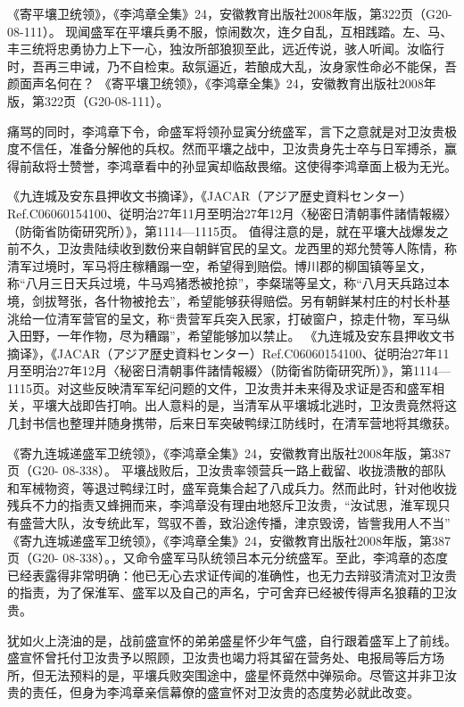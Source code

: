 \documentclass[12pt,UTF8]{ctexbook}
\begin{document}
《寄平壤卫统领》，《李鸿章全集》24，安徽教育出版社2008年版，第322页（G20-08-111）。
现闻盛军在平壤兵勇不服，惊闹数次，连夕自乱，互相践踏。左、马、丰三统将忠勇协力上下一心，独汝所部狼狈至此，远近传说，骇人听闻。汝临行时，吾再三申诫，乃不自检束。敌氛逼近，若酿成大乱，汝身家性命必不能保，吾颜面声名何在？ 《寄平壤卫统领》，《李鸿章全集》24，安徽教育出版社2008年版，第322页（G20-08-111）。

痛骂的同时，李鸿章下令，命盛军将领孙显寅分统盛军，言下之意就是对卫汝贵极度不信任，准备分解他的兵权。然而平壤之战中，卫汝贵身先士卒与日军搏杀，赢得前敌将士赞誉，李鸿章看中的孙显寅却临敌畏缩。这使得李鸿章面上极为无光。

《九连城及安东县押收文书摘译》，《JACAR（アジア歴史資料センター）Ref.C06060154100、従明治27年11月至明治27年12月〈秘密日清朝事件諸情報綴〉（防衛省防衛研究所）》，第1114—1115页。
值得注意的是，就在平壤大战爆发之前不久，卫汝贵陆续收到数份来自朝鲜官民的呈文。龙西里的郑允赞等人陈情，称清军过境时，军马将庄稼糟蹋一空，希望得到赔偿。博川郡的柳国镇等呈文，称“八月三日天兵过境，牛马鸡猪悉被抢掠”，李粲瑞等呈文，称“八月天兵路过本境，剑拔弩张，各什物被抢去”，希望能够获得赔偿。另有朝鲜某村庄的村长朴基洮给一位清军营官的呈文，称“贵营军兵突入民家，打破窗户，掠走什物，军马纵入田野，一年作物，尽为糟蹋”，希望能够加以禁止。 《九连城及安东县押收文书摘译》，《JACAR（アジア歴史資料センター）Ref.C06060154100、従明治27年11月至明治27年12月〈秘密日清朝事件諸情報綴〉（防衛省防衛研究所）》，第1114—1115页。对这些反映清军军纪问题的文件，卫汝贵并未来得及求证是否和盛军相关，平壤大战即告打响。出人意料的是，当清军从平壤城北逃时，卫汝贵竟然将这几封书信也整理并随身携带，后来日军突破鸭绿江防线时，在清军营地将其缴获。

《寄九连城递盛军卫统领》，《李鸿章全集》24，安徽教育出版社2008年版，第387页（G20- 08-338）。
平壤战败后，卫汝贵率领营兵一路上截留、收拢溃散的部队和军械物资，等退过鸭绿江时，盛军竟集合起了八成兵力。然而此时，针对他收拢残兵不力的指责又蜂拥而来，李鸿章没有理由地怒斥卫汝贵，“汝试思，淮军现只有盛营大队，汝专统此军，驾驭不善，致沿途传播，津京毁谤，皆訾我用人不当” 《寄九连城递盛军卫统领》，《李鸿章全集》24，安徽教育出版社2008年版，第387页（G20- 08-338）。，又命令盛军马队统领吕本元分统盛军。至此，李鸿章的态度已经表露得非常明确：他已无心去求证传闻的准确性，也无力去辩驳清流对卫汝贵的指责，为了保淮军、盛军以及自己的声名，宁可舍弃已经被传得声名狼藉的卫汝贵。

犹如火上浇油的是，战前盛宣怀的弟弟盛星怀少年气盛，自行跟着盛军上了前线。盛宣怀曾托付卫汝贵予以照顾，卫汝贵也竭力将其留在营务处、电报局等后方场所，但无法预料的是，平壤兵败突围途中，盛星怀竟然中弹殒命。尽管这并非卫汝贵的责任，但身为李鸿章亲信幕僚的盛宣怀对卫汝贵的态度势必就此改变。
\end{document}
